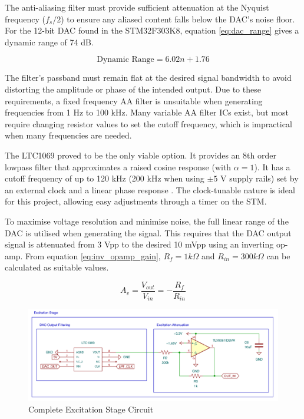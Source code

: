 The anti-aliasing filter must provide sufficient attenuation at the Nyquist frequency ($f_s/2$) to ensure any aliased content falls below the \ac{DAC}'s noise floor. For the 12-bit \ac{DAC} found in the STM32F303K8, equation \ref{eq:dac_range} gives a dynamic range of 74 dB. 

\begin{equation}
    \text{Dynamic Range} = 6.02n + 1.76 
    \label{eq:dac_range}
\end{equation}

The filter's passband must remain flat at the desired signal bandwidth to avoid distorting the amplitude or phase of the intended output. Due to these requirements, a fixed frequency AA filter is unsuitable when generating frequencies from 1 Hz to 100 kHz. Many variable AA filter ICs exist, but most require changing resistor values to set the cutoff frequency, which is impractical when many frequencies are needed. 

The LTC1069 proved to be the only viable option. It provides an 8th order lowpass filter that approximates a raised cosine response (with $\alpha=1$). It has a cutoff frequency of up to 120 kHz (200 kHz when using $\pm5$ V supply rails) set by an external clock and a linear phase response \cite{LTC10697CS8PBF}. The clock-tunable nature is ideal for this project, allowing easy adjustments through a timer on the STM.

To maximise voltage resolution and minimise noise, the full linear range of the \ac{DAC} is utilised when generating the signal. This requires that the \ac{DAC} output signal is attenuated from 3 Vpp to the desired 10 mVpp using an inverting op-amp. From equation \ref{eq:inv_opamp_gain}, $R_{f}=1 k\Omega$ and $R_{in}=300 k\Omega$ can be calculated as suitable values.

\begin{equation}
    A_v = \frac{V_{out}}{V_{in}} = -\frac{R_f}{R_{in}}
    \label{eq:inv_opamp_gain}
\end{equation}

\begin{figure}[]
    \centering
    \includegraphics[width=\textwidth]{ExcitationSchem.png}
    \caption{Complete Excitation Stage Circuit}
    \label{fig:excitation_stage_circuit}
\end{figure}

